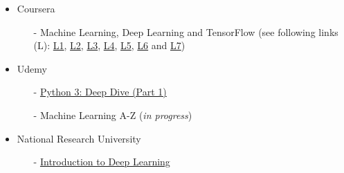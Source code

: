 \documentclass[10pt,a4paper,ragged2e,withhyper]{altacv}
\begin{document}
\begin{paracol}{2}
            \begin{itemize}
                \item Coursera
                \begin{itemize}
                    \item[-] Machine Learning, Deep Learning and TensorFlow (see following links (L): \href{https://coursera.org/share/50d1bfc2462e11112bc420d82f6eb622}{L1},
                    \href{https://coursera.org/share/e33debfdd7f6a2a39568d602dd7e50d3}{L2},
                    \href{https://coursera.org/share/0ac1fe62db824f63021bf5cbadc8effa}{L3},
                    \href{https://coursera.org/share/8efbea3377ef5eb01b909351d7c0f93c}{L4},
                    \href{https://coursera.org/share/d0e1636b353a300204e807db06b4f543}{L5},
                    \href{https://coursera.org/share/475e3f7e1c47e1dd90e153842b19823d}{L6} and
                    \href{https://coursera.org/share/a672fdfb0b627c56cbfad49b453e4be3}{L7})
                \end{itemize}
                \item Udemy
                \begin{itemize}
                    \item[-] 
                    \href{http://ude.my/UC-1e3f10fa-527a-4820-af92-9fdb1c4bc619}{Python 3: Deep Dive (Part 1)}
                    \item[-] Machine Learning A-Z ({\it in progress})
                \end{itemize}
                \item National Research University
                \begin{itemize}
                    \item[-] \href{https://coursera.org/share/88323987bae341a22c72dde06a326c6b}{Introduction to Deep Learning}
                \end{itemize}
            \end{itemize}
                    
                    
                
        
            \\
            \smallskip
            

\end{paracol}
\end{document}
